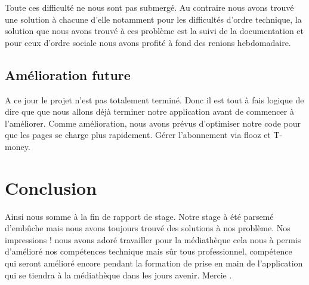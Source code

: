 \documentclass[12pt,a4paper]{article}
\begin{document}
Toute ces difficulté ne nous sont pas submergé. Au contraire nous avons trouvé une 
solution à chacune d'elle notamment pour les difficultés d'ordre technique, la solution 
que nous avons trouvé à ces problème est la suivi de la documentation et pour ceux 
d'ordre sociale nous avons profité à fond des renions hebdomadaire.

\subsection{Amélioration future}
A ce jour le projet n'est pas totalement terminé. Donc il est tout à fais logique de dire que
que nous allons déjà terminer notre application avant de commencer à l'améliorer.
Comme amélioration, nous avons prévus d'optimiser notre code pour que les pages se charge 
plus rapidement. Gérer l'abonnement via flooz et T-money.

\section{Conclusion}
Ainsi nous somme à la fin de rapport de stage. Notre stage à été parsemé d’embûche mais nous avons
toujours trouvé des solutions à nos problème. Nos impressions ! nous avons adoré travailler pour
la médiathèque cela nous à permis d'amélioré nos compétences technique mais sûr tous professionnel,
compétence qui seront amélioré encore pendant la formation de prise en main de l'application qui se
tiendra à la médiathèque dans les jours avenir. Mercie .
\end{document}
